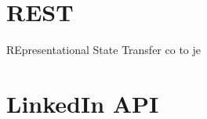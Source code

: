 \documentclass[12pt, oneside, a4paper]{book}
\begin{document}
%
%
%
%
%
%
%
%

\section{REST}

REpresentational State Transfer
co to je


\section{LinkedIn API}
\end{document}
